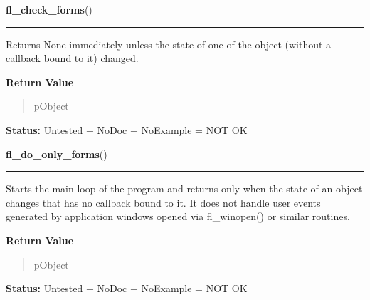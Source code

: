     \vspace{0.5ex}

\hspace{.8\funcindent}\begin{boxedminipage}{\funcwidth}

    \raggedright \textbf{fl\_check\_forms}()

    \vspace{-1.5ex}

    \rule{\textwidth}{0.5\fboxrule}
\setlength{\parskip}{2ex}
    Returns None immediately unless the state of one of the object (without
    a callback bound to it) changed.

\setlength{\parskip}{1ex}
      \textbf{Return Value}
    \vspace{-1ex}

      \begin{quote}
      pObject

      \end{quote}

\textbf{Status:} Untested + NoDoc + NoExample = NOT OK



    \end{boxedminipage}

    \label{xformslib:library:fl_do_only_forms}

    \vspace{0.5ex}

\hspace{.8\funcindent}\begin{boxedminipage}{\funcwidth}

    \raggedright \textbf{fl\_do\_only\_forms}()

    \vspace{-1.5ex}

    \rule{\textwidth}{0.5\fboxrule}
\setlength{\parskip}{2ex}
    Starts the main loop of the program and returns only when the state of 
    an object changes that has no callback bound to it. It does not handle 
    user events generated by application windows opened via fl\_winopen() 
    or similar routines.

\setlength{\parskip}{1ex}
      \textbf{Return Value}
    \vspace{-1ex}

      \begin{quote}
      pObject

      \end{quote}

\textbf{Status:} Untested + NoDoc + NoExample = NOT OK



    \end{boxedminipage}

